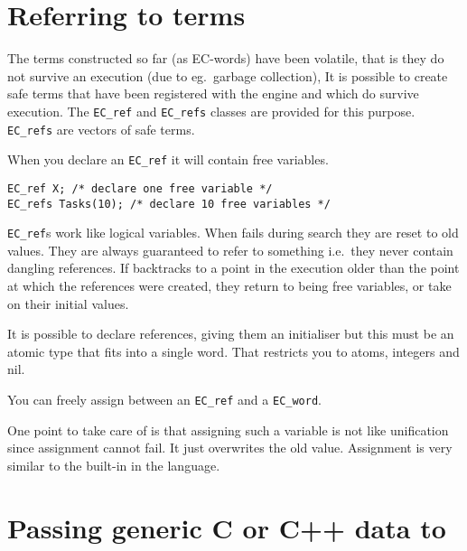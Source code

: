 \section{Referring to {\eclipse} terms}
\label{secrefs}

The terms constructed so far (as EC-words) have been volatile, that is they
do not survive an {\eclipse} execution (due to eg.\ garbage collection),
It is possible to create safe terms
that have been registered with the {\eclipse} engine and which do
survive execution. The \verb.EC_ref.  and \verb.EC_refs. classes
are provided for this purpose. \verb.EC_refs. are vectors of
safe terms.

When you declare an \verb.EC_ref. it will contain free variables.
\begin{verbatim}
EC_ref X; /* declare one free variable */
EC_refs Tasks(10); /* declare 10 free variables */
\end{verbatim}


\verb.EC_ref.s work like logical variables. When {\eclipse} fails during search
they are reset to old values. They are always guaranteed to refer to
something i.e.\ they never contain dangling references.
If {\eclipse} backtracks to a point in the execution
older than the point at which the references were created, they
return to being free variables, or take on their initial values.

It is possible to declare references, giving them an initialiser
but this must be an atomic type that fits into a single word. That
restricts you to atoms, integers and nil.

You can freely assign between an \verb.EC_ref. and a \verb.EC_word..

One point to take care of is that assigning such a variable
is not like unification since assignment cannot fail. It
just overwrites the old value. Assignment is very similar
to the  built-in in the {\eclipse} language.


\section{Passing generic C or C++ data to {\eclipse}}

